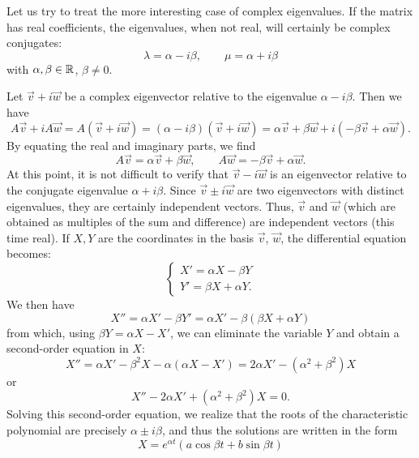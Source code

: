 Let us try to treat the more interesting case of complex eigenvalues. If the
matrix has real coefficients, the eigenvalues, when not real, will certainly be
complex conjugates:
\[
  \lambda = \alpha - i \beta,
  \qquad
  \mu = \alpha + i \beta
\]
with $\alpha,\beta\in {\mathbb R}$, $\beta\neq 0$.

Let $\vec v + i \vec w$ be a complex eigenvector relative to the eigenvalue
$\alpha - i \beta$. Then we have
\[
 A\vec v + i A \vec w
 = A(\vec v + i \vec w)
 = (\alpha - i \beta)(\vec v + i \vec w)
 = \alpha \vec v + \beta \vec w +i(-\beta \vec v + \alpha \vec w).
\]
By equating the real and imaginary parts, we find
\[
  A \vec v = \alpha \vec v + \beta \vec w,
  \qquad
  A \vec w = -\beta \vec v + \alpha \vec w.
\]
At this point, it is not difficult to verify that $\vec v - i \vec w$ is an
eigenvector relative to the conjugate eigenvalue $\alpha + i\beta$. Since $\vec
v\pm i\vec w$ are two eigenvectors with distinct eigenvalues, they are certainly
independent vectors. Thus, $\vec v$ and $\vec w$ (which are obtained as
multiples of the sum and difference) are independent vectors (this time real).
If $X,Y$ are the coordinates in the basis $\vec v$, $\vec w$, the differential
equation becomes:
\[
\begin{cases}
 X' = \alpha X - \beta Y \\
 Y' = \beta X + \alpha Y.
\end{cases}
\]
We then have%
\[
 X'' = \alpha X' - \beta Y'
 = \alpha X' - \beta (\beta X + \alpha Y)
\]
from which, using $\beta Y = \alpha X - X'$, we can eliminate the variable $Y$
and obtain a second-order equation in $X$:
\[
 X'' = \alpha X' - \beta^2 X - \alpha (\alpha X - X')
  = 2 \alpha X' - (\alpha^2+\beta^2) X
\]
or
\[
 X'' - 2 \alpha X' + (\alpha^2 + \beta^2) X = 0.
\]
Solving this second-order equation, we realize that the roots of the
characteristic polynomial are precisely $\alpha \pm i \beta$, and thus the
solutions are written in the form
\[
X = e^{\alpha t}(a \cos \beta t + b \sin \beta t)
\]
